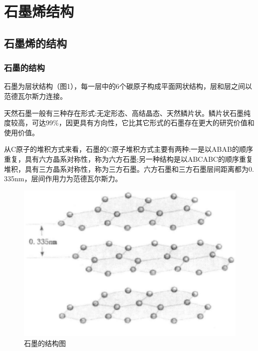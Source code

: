 
\chapter{石墨烯结构}


\section{石墨烯的结构}
\subsection{石墨的结构}
石墨为层状结构（图1），每一层中的6个碳原子构成平面网状结构，层和层之间以范德瓦尔斯力连接。\par
天然石墨一般有三种存在形式:无定形态、高结晶态、天然鳞片状。鳞片状石墨纯度较高，可达99$\%$，因更具有方向性，它比其它形式的石墨存在更大的研究价值和使用价值。\par
从C原子的堆积方式来看，石墨的C原子堆积方式主要有两种:一是以ABAB的顺序重复，具有六方晶系对称性，称为六方石墨;另一种结构是以ABCABC的顺序重复堆积，具有三方晶系对称性，称为三方石墨。六方石墨和三方石墨层间距离都为0. 335nm，层间作用力为范德瓦尔斯力。\par

{\begin{figure}[H]
        \centering
        \includegraphics{img/石墨的结构图.png}
        \caption{石墨的结构图}
        \label{fig:my_label}
    \end{figure}}

